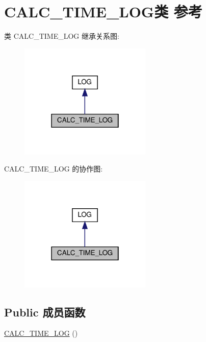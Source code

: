 \hypertarget{class_c_a_l_c___t_i_m_e___l_o_g}{}\section{C\+A\+L\+C\+\_\+\+T\+I\+M\+E\+\_\+\+L\+O\+G类 参考}
\label{class_c_a_l_c___t_i_m_e___l_o_g}


类 C\+A\+L\+C\+\_\+\+T\+I\+M\+E\+\_\+\+L\+OG 继承关系图\+:
\nopagebreak
\begin{figure}[H]
\begin{center}
\leavevmode
\includegraphics[width=178pt]{class_c_a_l_c___t_i_m_e___l_o_g__inherit__graph}
\end{center}
\end{figure}


C\+A\+L\+C\+\_\+\+T\+I\+M\+E\+\_\+\+L\+OG 的协作图\+:
\nopagebreak
\begin{figure}[H]
\begin{center}
\leavevmode
\includegraphics[width=178pt]{class_c_a_l_c___t_i_m_e___l_o_g__coll__graph}
\end{center}
\end{figure}
\subsection*{Public 成员函数}
\begin{DoxyCompactItemize}
\item 
\hyperlink{class_c_a_l_c___t_i_m_e___l_o_g_ab2d534be3ea8b72936ccf805f738cd25}{C\+A\+L\+C\+\_\+\+T\+I\+M\+E\+\_\+\+L\+OG} ()
\end{DoxyCompactItemize}
